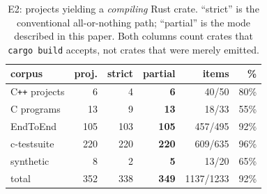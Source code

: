 \begin{table}[t]
\centering
\footnotesize
\caption{E2: projects yielding a \emph{compiling} Rust crate. ``strict'' is
the conventional all-or-nothing path; ``partial'' is the mode described in
this paper. Both columns count crates that \texttt{cargo build} accepts, not
crates that were merely emitted.}
\label{tab:e2}
\begin{tabular}{@{}lrrrrr@{}}
\toprule
\textbf{corpus} & \textbf{proj.} & \textbf{strict} & \textbf{partial}
 & \textbf{items} & \textbf{\%} \\
\midrule
C\texttt{++} projects & 6 & 4 & \textbf{6} & 40/50 & 80\% \\
C programs & 13 & 9 & \textbf{13} & 18/33 & 55\% \\
EndToEnd & 105 & 103 & \textbf{105} & 457/495 & 92\% \\
c-testsuite & 220 & 220 & \textbf{220} & 609/635 & 96\% \\
synthetic & 8 & 2 & \textbf{5} & 13/20 & 65\% \\
\midrule
total & 352 & 338 & \textbf{349} & 1137/1233 & 92\% \\
\bottomrule
\end{tabular}
\end{table}
